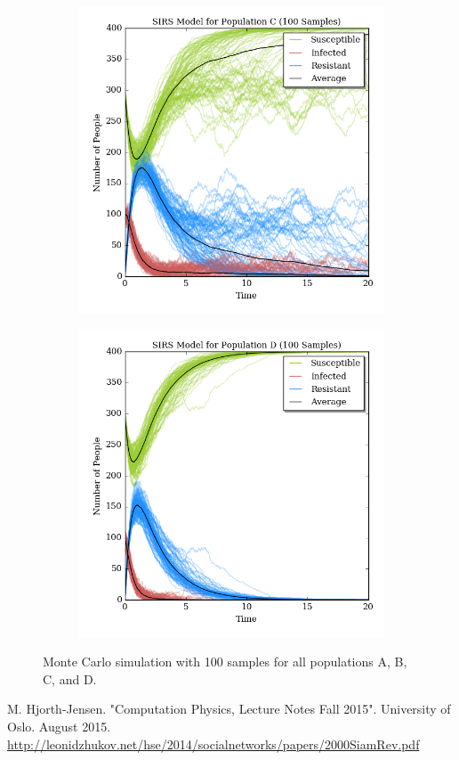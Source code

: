 \documentclass[prb,aps,twocolumn,showpacs,10pt]{revtex4-1}
\begin{document}
\begin{figure}
\medskip
\centering
\begin{subfigure}{.5\textwidth}
  \centering
  \includegraphics[width=\linewidth]{trials_C100.png}
  \label{fig:sub1}
\end{subfigure}%
\begin{subfigure}{.5\textwidth}
  \centering
  \includegraphics[width=\linewidth]{trials_D100.png}
  \label{fig:sub2}
\end{subfigure}
\label{fig:test}
\caption{Monte Carlo simulation with 100 samples for all populations A, B, C, and D.}
\end{figure}




\begin{references}
 M. Hjorth-Jensen. "Computation Physics, Lecture Notes Fall 2015". University of Oslo. August 2015.
 \url{http://leonidzhukov.net/hse/2014/socialnetworks/papers/2000SiamRev.pdf}
\end{references}
\end{document}
